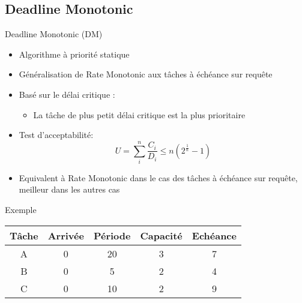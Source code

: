 \subsection{Deadline Monotonic}

\begin{frame}{Deadline Monotonic (DM)} 
  \begin{itemize}
  \item Algorithme à priorité statique
\item Généralisation de Rate Monotonic aux tâches à échéance sur requête
  \item Basé sur le délai critique :
    \begin{itemize}
    \item La tâche de plus petit délai critique est la plus prioritaire
    \end{itemize}
\item Test d'acceptabilité:
  $$U = \sum_i^n \frac{C_i}{D_i} \leq n \left(2^{\frac{1}{n}}-1\right)$$
  \item Equivalent à Rate Monotonic  dans le cas des tâches à échéance
    sur requête, meilleur dans les autres cas
  \end{itemize}
\end{frame}

\begin{frame}{Exemple}
  \begin{center}
    \begin{tabular}{ccccc}
      \hline
      Tâche & Arrivée & Période & Capacité & Echéance \\
      \hline
      A & 0 & 20 & 3 & 7\\
      B & 0 &  5 & 2 & 4\\
      C & 0 & 10 & 2 & 9\\
      \hline
    \end{tabular}
  \end{center}
\end{frame} 

